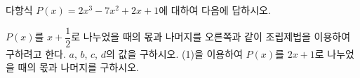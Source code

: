 \noindent\begin{minipage}[t]{0.58\linewidth}\vspace{0pt}\raggedright 다항식 $P(x)=2x^3-7x^2+2x+1$에 대하여 다음에 답하시오.\end{minipage}\hfill\begin{minipage}[t]{0.4\linewidth}\vspace{0pt}\centering \resizebox{\ifdim\width>\linewidth\linewidth\else\width\fi}{!}{}\end{minipage}\par
{} $P(x)$를 $x+\dfrac{1}{2}$로 나누었을 때의 몫과 나머지를 오른쪽과 같이 조립제법을 이용하여 구하려고 한다. $a$, $b$, $c$, $d$의 값을 구하시오.
 (1)을 이용하여 $P(x)$를 $2x+1$로 나누었을 때의 몫과 나머지를 구하시오.
